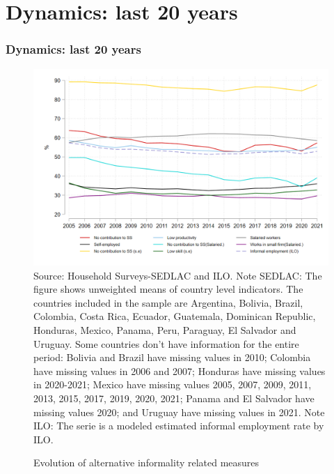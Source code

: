 \documentclass{beamer}
\begin{document}
\section{Dynamics: last 20 years}  
\begin{frame}
\frametitle{Dynamics: last 20 years}
\begin{figure}[!htb]
        \justifying
        \caption{Evolution of alternative informality related measures}     
        \includegraphics[scale=.2]{latex/figures/Evolution/informality_evolution_LAC.png}
        \label{fig:EvolutionLAC}
        \footnotesize{Source: Household Surveys-SEDLAC and ILO.}
        \footnotesize{Note SEDLAC: The figure shows unweighted means of country level indicators. The countries included in the sample are Argentina, Bolivia, Brazil, Colombia, Costa Rica, Ecuador, Guatemala, Dominican Republic, Honduras, Mexico, Panama, Peru, Paraguay, El Salvador and Uruguay. Some countries don’t have information for the entire period: Bolivia and Brazil have missing values in 2010; Colombia have missing values in 2006 and 2007; Honduras have missing values in 2020-2021; Mexico have missing values 2005, 2007, 2009, 2011, 2013, 2015, 2017, 2019, 2020, 2021; Panama and El Salvador have missing values 2020; and Uruguay have missing values in 2021. Note ILO: The serie is a modeled estimated informal employment rate by ILO.}
 \end{figure}
 \end{frame}
\end{document}
